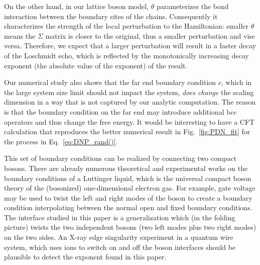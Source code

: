 On the other hand, in our lattice boson model, $\theta$ parameterizes the bond interaction between the boundary sites of the chains. Consequently it characterizes the strength of the local perturbation to the Hamiltonian: smaller $\theta$ means the $\Sigma$ matrix is closer to the original, thus a smaller perturbation and vise versa. Therefore, we expect that a larger perturbation will result in a faster decay of the Loschmidt echo, which is reflected by the monotonically increasing decay exponent (the absolute value of the exponent) of the result.

Our numerical study also shows that the far end boundary condition $c$, which in the large system size limit should not impact the system, {\it does change} the scaling dimension in a way that is not captured by our analytic computation. The reason is that the boundary condition on the far end may introduce additional bcc operators and thus change the free energy. It would be interesting to have a CFT calculation that reproduces the better numerical result in Fig.~\ref{fig:PDN_fit} for the process in Eq.~\eqref{eq:DNP_rand()}. 


This set of boundary conditions can be realized by connecting two compact bosons. There are already numerous theoretical and experimental works on the boundary conditions of a Luttinger liquid\cite{schmeltzer_zero_1999,anfuso_luttinger_2003,voit_bounded_2000,fabrizio_interacting_1995,egger_applying_1998}, which is the universal compact boson theory of the (bosonized) one-dimensional electron gas\cite{giamarchi_quantum_2015}. For example, gate voltage \cite{egger_applying_1998} may be used to twist the left and right modes of the boson to create a boundary condition interpolating between the normal open and fixed boundary conditions. The interface studied in this paper is a generalization which (in the folding picture) twists the two independent bosons (two left modes plus two right modes) on the two sides. An X-ray edge singularity experiment in a quantum wire system, which uses ions to switch on and off the boson interfaces should be plausible to detect the exponent found in this paper. 


